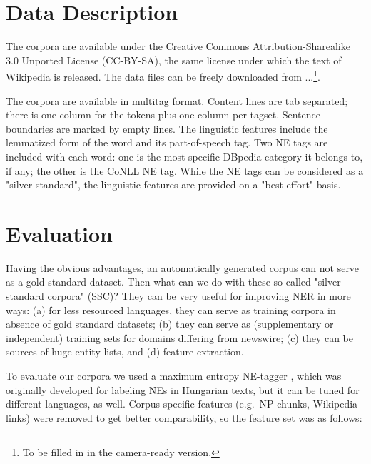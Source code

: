 \documentclass[11pt]{article}
\begin{document}

\section{Data Description}

The corpora are available under the Creative Commons Attribution-Sharealike 3.0 Unported License (CC-BY-SA), the same license under which the text of Wikipedia is released. The data files can be freely downloaded from ...\footnote{To be filled in in the camera-ready version.}.

The corpora are available in multitag format. Content lines are tab separated; there is one column for the tokens plus one column per tagset. Sentence boundaries are marked by empty lines. The linguistic features include the lemmatized form of the word and its part-of-speech tag. Two NE tags are included with each word: one is the most specific DBpedia category it belongs to, if any; the other is the CoNLL NE tag. While the NE tags can be considered as a "silver standard", the linguistic features are provided on a "best-effort" basis.

\section{Evaluation}


Having the obvious advantages, an automatically generated corpus can not serve as a gold standard dataset. Then what can we do with these so called "silver standard corpora" (SSC)? They can be very useful for improving NER in more ways: (a) for less resourced languages, they can serve as training corpora in absence of gold standard datasets; (b) they can serve as (supplementary or independent) training sets for domains differing from newswire; (c) they can be sources of huge entity lists, and (d) feature extraction. 

To evaluate our corpora we used a maximum entropy NE-tagger \cite{Varga:07}, which was originally developed for labeling NEs in Hungarian texts, but it can be tuned for different languages, as well. Corpus-specific features (e.g.~NP chunks, Wikipedia links) were removed to get better comparability, so the feature set was as follows:
\end{document}
